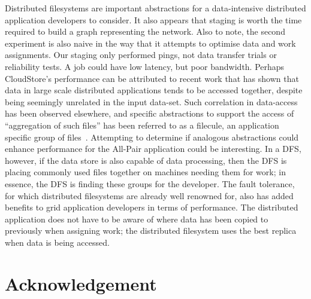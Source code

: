 \documentclass[a4paper,11pt]{article} \pagestyle{empty} \usepackage{amssymb}
\begin{document}
Distributed filesystems are important abstractions for a data-intensive
distributed application developers to consider. It also appears that
staging is worth the time required to build a graph representing the
network. Also to note, the second experiment is also naive in the way
that it attempts to optimise data and work assignments. Our staging only
performed pings, not data transfer trials or reliability tests. A job
could have low latency, but poor bandwidth. Perhaps CloudStore's
performance can be attributed to recent work that has shown that data in
large scale distributed applications tends to be accessed together,
despite being seemingly unrelated in the input data-set. Such
correlation in data-access has been observed elsewhere, and specific
abstractions to support the access of ``aggregation of such files'' has
been referred to as a filecule, an application specific group of
files~\cite{filecule}. Attempting to determine if analogous abstractions
could enhance performance for the All-Pair application could be
interesting.  In a DFS, however, if the data store is also capable of
data processing, then the DFS is placing commonly used files together on
machines needing them for work; in essence, the DFS is finding these
groups for the developer. The fault tolerance, for which distributed
filesystems are already well renowned for, also has added benefits to
grid application developers in terms of performance. The distributed
application does not have to be aware of where data has been copied to
previously when assigning work; the distributed filesystem uses the best
replica when data is being accessed.
\section{Acknowledgement}

 

\end{document}
